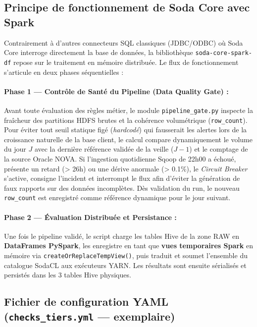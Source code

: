 \subsection{Principe de fonctionnement de Soda Core avec Spark}

Contrairement à d'autres connecteurs SQL classiques (JDBC/ODBC) où Soda Core interroge directement la base de données, la bibliothèque \texttt{soda-core-spark-df} repose sur le traitement en mémoire distribuée. Le flux de fonctionnement s'articule en deux phases séquentielles :

\paragraph{Phase 1 — Contrôle de Santé du Pipeline (Data Quality Gate) :} Avant toute évaluation des règles métier, le module \texttt{pipeline\_gate.py} inspecte la fraîcheur des partitions HDFS brutes et la cohérence volumétrique (\texttt{row\_count}). Pour éviter tout seuil statique figé (\textit{hardcodé}) qui fausserait les alertes lors de la croissance naturelle de la base client, le calcul compare dynamiquement le volume du jour $J$ avec la dernière référence validée de la veille ($J-1$) et le comptage de la source Oracle NOVA. Si l'ingestion quotidienne Sqoop de 22h00 a échoué, présente un retard (> 26h) ou une dérive anormale (> 0.1\%), le \textit{Circuit Breaker} s'active, consigne l'incident et interrompt le flux afin d'éviter la génération de faux rapports sur des données incomplètes. Dès validation du run, le nouveau \texttt{row\_count} est enregistré comme référence dynamique pour le jour suivant.

\paragraph{Phase 2 — Évaluation Distribuée et Persistance :} Une fois le pipeline validé, le script charge les tables Hive de la zone RAW en \textbf{DataFrames PySpark}, les enregistre en tant que \textbf{vues temporaires Spark} en mémoire via \texttt{createOrReplaceTempView()}, puis traduit et soumet l'ensemble du catalogue SodaCL aux exécuteurs YARN. Les résultats sont ensuite sérialisés et persistés dans les 3 tables Hive physiques.

\subsection{Fichier de configuration YAML (\texttt{checks\_tiers.yml} — exemplaire)}

